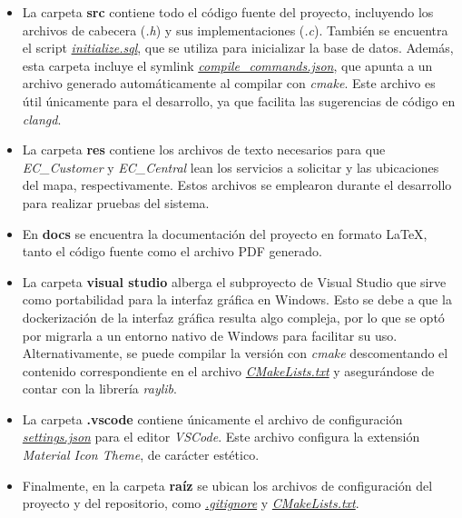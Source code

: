\documentclass[a4paper,12pt]{article}
\begin{document}
\begin{itemize}

  \item La carpeta \textbf{src} contiene todo el código fuente del proyecto, incluyendo los archivos de cabecera
        (\textit{.h}) y sus implementaciones (\textit{.c}). También se encuentra el script
        \textit{\href{https://github.com/abtb2-ua/easycab/blob/main/src/initialize.sql}{initialize.sql}}, que se
        utiliza para inicializar la base de datos. Además, esta carpeta incluye el symlink
        \textit{\href{https://github.com/abtb2-ua/easycab/blob/main/src/compile_commands.json}{compile\_commands.json}},
        que apunta a un archivo generado automáticamente al compilar con \textit{cmake}. Este archivo es útil únicamente
        para el desarrollo, ya que facilita las sugerencias de código en \textit{clangd}.

  \item La carpeta \textbf{res} contiene los archivos de texto necesarios para que \break\textit{EC\_Customer} y \textit{EC\_Central}
        lean los servicios a solicitar y las ubicaciones del mapa, respectivamente. Estos archivos se emplearon durante el desarrollo
        para realizar pruebas del sistema.

  \item En \textbf{docs} se encuentra la documentación del proyecto en formato LaTeX, tanto el código fuente como el archivo PDF generado.

  \item La carpeta \textbf{visual studio} alberga el subproyecto de Visual Studio que sirve como portabilidad para la interfaz gráfica
        en Windows. Esto se debe a que la dockerización de la interfaz gráfica resulta algo compleja, por lo que se optó por migrarla a
        un entorno nativo de Windows para facilitar su uso. Alternativamente, se puede compilar la versión con \textit{cmake} descomentando
        el contenido correspondiente en el archivo
        \textit{\href{https://github.com/abtb2-ua/easycab/blob/main/CMakeLists.txt}{CMakeLists.txt}} y asegurándose de contar con la librería
        \textit{raylib}.

  \item La carpeta \textbf{.vscode} contiene únicamente el archivo de configuración
        \textit{\href{https://github.com/abtb2-ua/easycab/blob/main/.vscode/settings.json}{settings.json}} para el editor \textit{VSCode}.
        Este archivo configura la extensión \textit{Material Icon Theme}, de carácter estético.

  \item Finalmente, en la carpeta \textbf{raíz} se ubican los archivos de configuración del proyecto y del repositorio,
        como \textit{\href{https://github.com/abtb2-ua/easycab/blob/main/.gitignore}{.gitignore}} y \textit{\href{https://github.com/abtb2-ua/easycab/blob/main/CMakeLists.txt}{CMakeLists.txt}}. \end{itemize}
\end{document}
